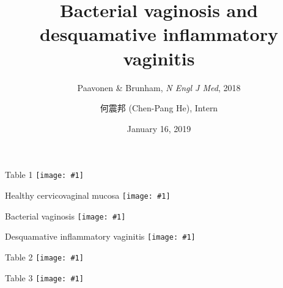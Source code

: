 \documentclass{beamer}
\title[Vaginitis]{Bacterial vaginosis and desquamative inflammatory vaginitis}
\subtitle{Paavonen \& Brunham, \textit{N Engl J Med}, 2018}
\author[Chen-Pang He]{何震邦 (Chen-Pang He), Intern}
\date{January 16, 2019}
\institute[CGH]{Cathay General Hospital}
\newcommand*{\solo}[1]{\centering\texttt{[image: \#1]}}
\begin{document}
\maketitle

\begin{frame}{Table 1}
    \solo{T1.eps}
\end{frame}

\begin{frame}{Healthy cervicovaginal mucosa}
    \solo{F1a.jpg}
\end{frame}

\begin{frame}{Bacterial vaginosis}
    \solo{F1c.jpg}
\end{frame}

\begin{frame}{Desquamative inflammatory vaginitis}
    \solo{F1e.jpg}
\end{frame}

\begin{frame}{Table 2}
    \solo{T2.eps}
\end{frame}

\begin{frame}{Table 3}
    \solo{T3.eps}
\end{frame}
\end{document}
